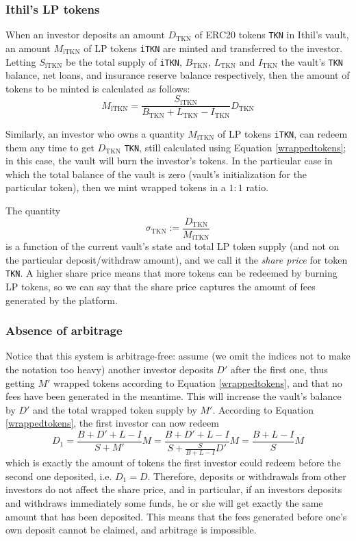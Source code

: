 \documentclass[a4paper,10 pt]{article}
\theoremstyle{definition}
\begin{document}
\subsubsection{Ithil's LP tokens}
When an investor deposits an amount $D_{\text{TKN}}$ of ERC20 tokens \verb|TKN| in Ithil's vault, an amount $M_{\text{iTKN}}$ of LP tokens \verb|iTKN| are minted and transferred to the investor. Letting $S_{\text{iTKN}}$ be the total supply of \verb|iTKN|, $B_{\text{TKN}}$, $L_{\text{TKN}}$ and $I_{\text{TKN}}$ the vault's \verb|TKN| balance, net loans, and insurance reserve balance respectively, then the amount of tokens to be minted is calculated as follows:
\begin{equation}\label{wrappedtokens}M_{\text{iTKN}} = \frac{S_{\text{iTKN}}}{B_{\text{TKN}} + L_{\text{TKN}} - I_{\text{TKN}}}D_{\text{TKN}}\end{equation}

Similarly, an investor who owns a quantity $M_{\text{iTKN}}$ of LP tokens \verb|iTKN|, can redeem them any time to get $D_{\text{TKN}}$ \verb|TKN|, still calculated using Equation \eqref{wrappedtokens}; in this case, the vault will burn the investor's tokens. In the particular case in which the total balance of the vault is zero (vault's initialization for the particular token), then we mint wrapped tokens in a $1:1$ ratio.

The quantity $$\sigma_{\text{TKN}} := \frac{D_{\text{TKN}}}{M_{\text{iTKN}}}$$ is a function of the current vault's state and total LP token supply (and not on the particular deposit/withdraw amount), and we call it the {\it share price} for token \verb|TKN|. A higher share price means that more tokens can be redeemed by burning LP tokens, so we can say that the share price captures the amount of fees generated by the platform.

\subsubsection{Absence of arbitrage}
Notice that this system is arbitrage-free: assume (we omit the indices not to make the notation too heavy) another investor deposits $D'$ after the first one, thus getting $M'$ wrapped tokens according to Equation \eqref{wrappedtokens}, and that no fees have been generated in the meantime. This will increase the vault's balance by $D'$ and the total wrapped token supply by $M'$. According to Equation \eqref{wrappedtokens}, the first investor can now redeem
\begin{equation}D_1 = \frac{B+D'+L-I}{S+M'}M = \frac{B+D'+L-I}{S+\frac{S}{B+L-I}D'}M = \frac{B+L-I}{S}M \end{equation}
which is exactly the amount of tokens the first investor could redeem before the second one deposited, i.e. $D_1 = D$. Therefore, deposits or withdrawals from other investors do not affect the share price, and in particular, if an investors deposits and withdraws immediately some funds, he or she will get exactly the same amount that has been deposited. This means that the fees generated before one's own deposit cannot be claimed, and arbitrage is impossible.
\end{document}
